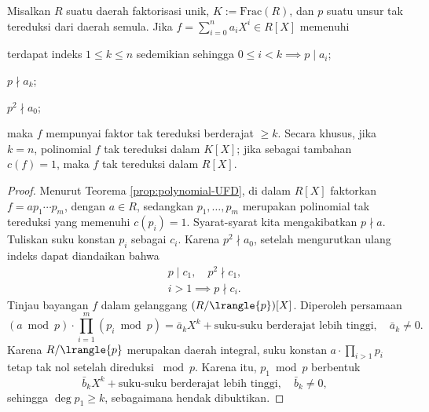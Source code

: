 \begin{theorem}\label{prop:Eisenstein-criterion}
	Misalkan $R$ suatu daerah faktorisasi unik, $K := \mathrm{Frac}(R)$, dan $p$ suatu unsur tak tereduksi dari daerah semula. Jika $f = \sum_{i=0}^n a_i X^i \in R[X]$ memenuhi
	\begin{compactitem}
		\item terdapat indeks $1 \leq k \leq n$ sedemikian sehingga $0 \leq i < k \implies p \mid a_i$;
		\item $p \nmid a_k$;
		\item $p^2 \nmid a_0$;
	\end{compactitem}
	maka $f$ mempunyai faktor tak tereduksi berderajat $\geq k$. Secara khusus, jika $k=n$, polinomial $f$ tak tereduksi dalam $K[X]$; jika sebagai tambahan $c(f)=1$, maka $f$ tak tereduksi dalam $R[X]$.
\end{theorem}
\begin{proof}
	Menurut Teorema \ref{prop:polynomial-UFD}, di dalam $R[X]$ faktorkan $f = a p_1 \cdots p_m$, dengan $a \in R$, sedangkan $p_1, \ldots, p_m$ merupakan polinomial tak tereduksi yang memenuhi $c(p_i)=1$. Syarat-syarat kita mengakibatkan $p \nmid a$. Tuliskan suku konstan $p_i$ sebagai $c_i$. Karena $p^2 \nmid a_0$, setelah mengurutkan ulang indeks dapat diandaikan bahwa
	\begin{gather*}
		p \mid c_1, \quad p^2 \nmid c_1, \\
		i>1 \implies p \nmid c_i.
	\end{gather*}
	Tinjau bayangan $f$ dalam gelanggang $(R/\lrangle{p})[X]$. Diperoleh persamaan
	\[ (a \bmod p) \cdot \prod_{i=1}^m (p_i \bmod p) = \bar{a}_k X^k + \text{suku-suku berderajat lebih tinggi}, \quad \bar{a}_k \neq 0. \]
	Karena $R/\lrangle{p}$ merupakan daerah integral, suku konstan $a \cdot \prod_{i > 1} p_i$ tetap tak nol setelah direduksi $\bmod p$. Karena itu, $p_1 \bmod p$ berbentuk
	\[ \bar{b}_k X^k + \text{suku-suku berderajat lebih tinggi}, \quad \bar{b}_k \neq 0, \]
	sehingga $\deg p_1 \geq k$, sebagaimana hendak dibuktikan.
\end{proof}
